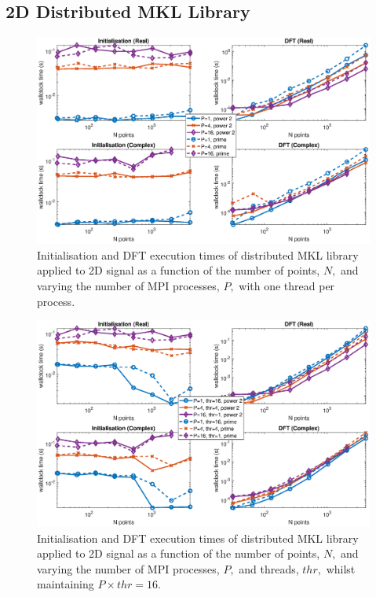\documentclass[a4paper]{article}
\begin{document}
\subsection{2D Distributed MKL Library}\label{Sec:2DDistMKL}

\begin{figure}[htb]
    \centering
    \includegraphics[width=\linewidth]{../results/mkl_2d_mpi.eps}
  \caption{Initialisation and DFT execution times of distributed MKL library applied to 2D signal as a function of the
    number of points, $N,$ and varying the number of MPI processes, $P,$ with one thread per process.}
  \label{2DDistMKL}
\end{figure}

\begin{figure}[htb]
    \centering
    \includegraphics[width=\linewidth]{../results/mkl_2d_mpi_thr.eps}
  \caption{Initialisation and DFT execution times of distributed MKL library applied to 2D signal as a function of the
    number of points, $N,$ and varying the number of MPI processes, $P,$ and threads, $thr,$ whilst maintaining $P\times thr=16.$}
  \label{2DDistMKL16}
\end{figure}
\end{document}
